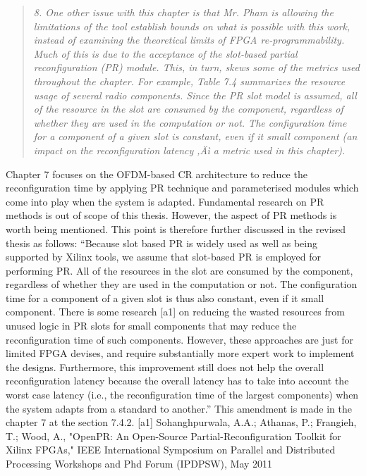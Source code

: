 \documentclass{article}
\begin{document}
\begin{quote}
\emph{8. One other issue with this chapter is that Mr. Pham is allowing the limitations of the tool establish bounds on what is possible with this work, instead of examining the theoretical limits of FPGA re-programmability. Much of this is due to the acceptance of the slot-based partial reconfiguration (PR) module. This, in turn, skews some of the metrics used throughout the chapter. For example, Table 7.4 summarizes the resource usage of several radio components. Since the PR slot model is assumed, all of the resource in the slot are consumed by the component, regardless of whether they are used in the computation or not. The configuration time for a component of a given slot is constant, even if it small component (an impact on the reconfiguration latency ‚Äì a metric used in this chapter).}
\end{quote}
Chapter 7 focuses on the OFDM-based CR architecture to reduce the reconfiguration time by applying PR technique and parameterised modules which come into play when the system is adapted. Fundamental research on PR methods is out of scope of this thesis. However, the aspect of PR methods is worth being mentioned. This point is therefore further discussed in the revised thesis as follows:
``Because slot based PR is widely used as well as being supported by Xilinx tools, we assume that slot-based PR is employed for performing PR.
All of the resources in the slot are consumed by the component, regardless of whether they are used in the computation or not. The configuration time for a component of a given slot is thus also constant, even if it small component.
There is some research [a1] on reducing the wasted resources from unused logic in PR slots for small components that may reduce the reconfiguration time of such components. However, these approaches are just for limited FPGA devises, and require substantially more expert work to implement the designs.  
Furthermore, this improvement still does not help the overall reconfiguration latency because the overall latency has to take into account the worst case latency (i.e., the reconfiguration time of the largest components) when the system adapts from a standard to another.''
This amendment is made in the chapter 7 at the section 7.4.2.
[a1]  Sohanghpurwala, A.A.; Athanas, P.; Frangieh, T.; Wood, A., "OpenPR: An Open-Source Partial-Reconfiguration Toolkit for Xilinx FPGAs," IEEE International Symposium on Parallel and Distributed Processing Workshops and Phd Forum (IPDPSW), May 2011
\end{document}
